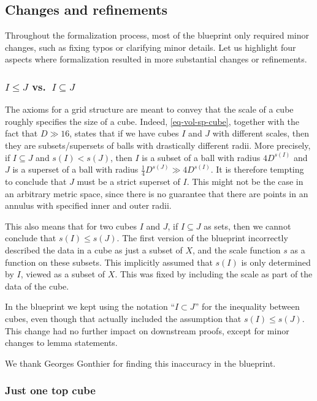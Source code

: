 \documentclass[12pt, reqno]{amsart}
\theoremstyle{definition}
\theoremstyle{plain}
\begin{document}
\subsection{Changes and refinements}\label{subsec:blueprint_changes}

Throughout the formalization process, most of the blueprint only required minor changes, such as fixing typos or clarifying minor details. Let us highlight four aspects where formalization resulted in more substantial changes or refinements.

\subsubsection{$I \leq J$ vs.\ $I \subseteq J$}
The axioms for a grid structure are meant to convey that the scale of a cube roughly specifies the size of a cube.
Indeed, \eqref{eq-vol-sp-cube}, together with the fact that $D\gg 16$,
states that if we have cubes $I$ and $J$ with different scales, then they are subsets/supersets of balls with drastically different radii.
More precisely, if $I\subseteq J$ and $s(I)<s(J)$,
then $I$ is a subset of a ball with radius $4D^{s(I)}$
and $J$ is a superset of a ball with radius $\frac{1}{4}D^{s(J)}\gg 4D^{s(I)}$.
It is therefore tempting to conclude that $J$ must be a strict superset of $I$.
This might not be the case in an arbitrary metric space,
since there is no guarantee that there are points
in an annulus with specified inner and outer radii.

This also means that for two cubes $I$ and $J$, if $I\subseteq J$ as sets,
then we cannot conclude that $s(I)\le s(J)$.
The first version of the blueprint incorrectly described the data in a cube as just a subset of $X$,
and the scale function $s$ as a function on these subsets.
This implicitly assumed that $s(I)$ is only determined by $I$, viewed as a subset of $X$.
This was fixed by including the scale as part of the data of the cube.

In the blueprint we kept using the notation ``$I \subset J$'' for the inequality between cubes,
even though that actually included the assumption that $s(I) \le s(J)$.
This change had no further impact on downstream proofs, except for minor changes to lemma statements.

We thank Georges Gonthier for finding this inaccuracy in the blueprint.

\subsubsection{Just one top cube}
\end{document}
